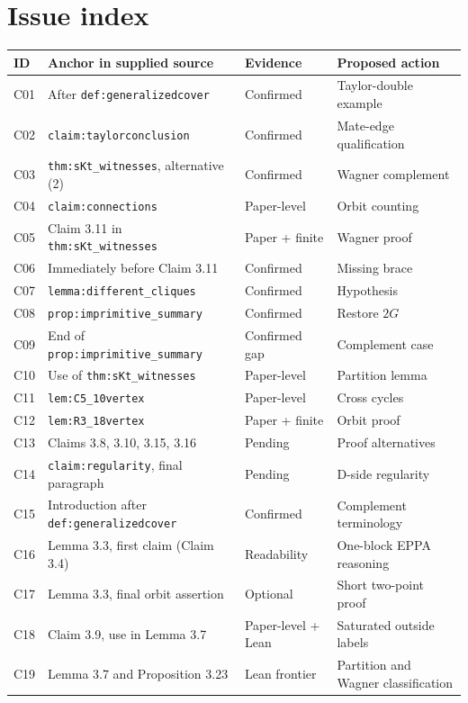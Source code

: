 \documentclass[11pt,a4paper]{article}
\begin{document}
\section*{Issue index}
\setlength{\tabcolsep}{3pt}
\begin{longtable}{@{}p{15mm}p{66mm}p{32mm}p{35mm}@{}}
\toprule
ID & Anchor in supplied source & Evidence & Proposed action\\
\midrule
C01 & After \texttt{def:generalizedcover} & Confirmed & Taylor-double example\\
C02 & \texttt{claim:taylorconclusion} & Confirmed & Mate-edge qualification\\
C03 & \texttt{thm:sKt\_witnesses}, alternative (2) & Confirmed & Wagner complement\\
C04 & \texttt{claim:connections} & Paper-level & Orbit counting\\
C05 & Claim 3.11 in \texttt{thm:sKt\_witnesses} & Paper + finite & Wagner proof\\
C06 & Immediately before Claim 3.11 & Confirmed & Missing brace\\
C07 & \texttt{lemma:different\_cliques} & Confirmed & Hypothesis\\
C08 & \texttt{prop:imprimitive\_summary} & Confirmed & Restore \(2G\)\\
C09 & End of \texttt{prop:imprimitive\_summary} & Confirmed gap & Complement case\\
C10 & Use of \texttt{thm:sKt\_witnesses} & Paper-level & Partition lemma\\
C11 & \texttt{lem:C5\_10vertex} & Paper-level & Cross cycles\\
C12 & \texttt{lem:R3\_18vertex} & Paper + finite & Orbit proof\\
C13 & Claims 3.8, 3.10, 3.15, 3.16 & Pending & Proof alternatives\\
C14 & \texttt{claim:regularity}, final paragraph & Pending & D-side regularity\\
C15 & Introduction after \texttt{def:generalizedcover} & Confirmed & Complement terminology\\
C16 & Lemma 3.3, first claim (Claim 3.4) & Readability & One-block EPPA reasoning\\
C17 & Lemma 3.3, final orbit assertion & Optional & Short two-point proof\\
C18 & Claim 3.9, use in Lemma 3.7 & Paper-level + Lean & Saturated outside labels\\
C19 & Lemma 3.7 and Proposition 3.23 & Lean frontier & Partition and Wagner classification\\

\end{longtable}
\end{document}

